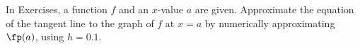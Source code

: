 \begin{exerciseset}{In Exercises}{, a function $f$ and an $x$-value $a$ are given. Approximate the equation of the tangent line to the graph of $f$ at $x=a$ by numerically approximating $\fp(a)$, using $h=0.1$.}







\end{exerciseset}
